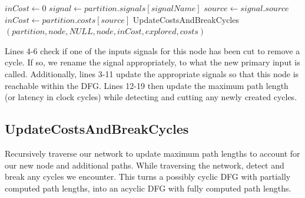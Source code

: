 \documentclass[12pt,final,oneside]{article} %
\begin{document}
\begin{algorithm}
\begin{algorithmic}[1]
            \State $inCost \gets 0$
               \State $signal \gets partition.signals[signalName]$
               \State $source \gets signal.source$
                  \State $inCost \gets partition.costs[source]$
               \EndIf
            \EndFor
            \State UpdateCostsAndBreakCycles$(partition, node, NULL, node, inCost, explored, costs)$
         \EndProcedure
   \end{algorithmic}
\end{algorithm}
Lines 4-6 check if one of the inputs signals for this node has been cut to remove a cycle. If so, we rename the signal appropriately, to what the new primary input is called.
Additionally, lines 3-11 update the appropriate signals so that this node is reachable within the \ac{DFG}.
Lines 12-19 then update the maximum path length (or latency in clock cycles) while detecting and cutting any newly created cycles.


\newpage
\subsection{UpdateCostsAndBreakCycles}
Recursively traverse our network to update maximum path lengths to account for our new node and additional paths. While traversing the network, detect and break any cycles we encounter.
This turns a possibly cyclic \ac{DFG} with partially computed path lengths, into an acyclic \ac{DFG} with fully computed path lengths.
\end{document}
